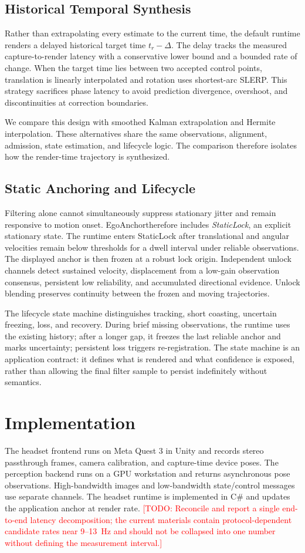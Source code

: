 \documentclass[review]{vgtc}
\newcommand{\system}{EgoAnchor}
\newcommand{\todo}[1]{\textcolor{red}{[TODO: #1]}}
\begin{document}
\subsection{Historical Temporal Synthesis}
Rather than extrapolating every estimate to the current time, the default runtime renders a delayed historical target time $t_r-\Delta$. The delay tracks the measured capture-to-render latency with a conservative lower bound and a bounded rate of change. When the target time lies between two accepted control points, translation is linearly interpolated and rotation uses shortest-arc SLERP. This strategy sacrifices phase latency to avoid prediction divergence, overshoot, and discontinuities at correction boundaries.

We compare this design with smoothed Kalman extrapolation and Hermite interpolation. These alternatives share the same observations, alignment, admission, state estimation, and lifecycle logic. The comparison therefore isolates how the render-time trajectory is synthesized.

\subsection{Static Anchoring and Lifecycle}
Filtering alone cannot simultaneously suppress stationary jitter and remain responsive to motion onset. \system therefore includes \emph{StaticLock}, an explicit stationary state. The runtime enters StaticLock after translational and angular velocities remain below thresholds for a dwell interval under reliable observations. The displayed anchor is then frozen at a robust lock origin. Independent unlock channels detect sustained velocity, displacement from a low-gain observation consensus, persistent low reliability, and accumulated directional evidence. Unlock blending preserves continuity between the frozen and moving trajectories.

The lifecycle state machine distinguishes tracking, short coasting, uncertain freezing, loss, and recovery. During brief missing observations, the runtime uses the existing history; after a longer gap, it freezes the last reliable anchor and marks uncertainty; persistent loss triggers re-registration. The state machine is an application contract: it defines what is rendered and what confidence is exposed, rather than allowing the final filter sample to persist indefinitely without semantics.

\section{Implementation}
The headset frontend runs on Meta Quest 3 in Unity and records stereo passthrough frames, camera calibration, and capture-time device poses. The perception backend runs on a GPU workstation and returns asynchronous pose observations. High-bandwidth images and low-bandwidth state/control messages use separate channels. The headset runtime is implemented in C\# and updates the application anchor at render rate. \todo{Reconcile and report a single end-to-end latency decomposition; the current materials contain protocol-dependent candidate rates near 9--13~Hz and should not be collapsed into one number without defining the measurement interval.}
\end{document}
